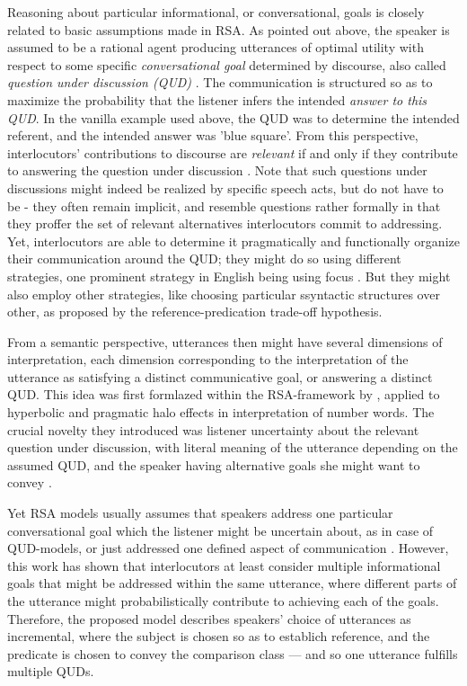 Reasoning about particular informational, or conversational, goals is closely related to basic assumptions made in RSA.
As pointed out above, the speaker is assumed to be a rational agent producing utterances of optimal utility with respect to some specific \emph{conversational goal} determined by discourse, also called \emph{question under discussion (QUD)}  \parencite{lassiter2017adjectival, roberts2012information}. The communication is structured so as to maximize the probability that the listener infers the intended \emph{answer to this QUD}. In the vanilla example used above, the QUD was to determine the intended referent, and the intended answer was 'blue square'. From this perspective, interlocutors' contributions to discourse are \emph{relevant} if and only if they contribute to answering the question under discussion \parencite{roberts2012information}. Note that such questions under discussions might indeed be realized by specific speech acts, but do not have to be - they often remain implicit, and resemble questions rather formally in that they proffer the set of relevant alternatives interlocutors commit to addressing. Yet, interlocutors are able to determine it pragmatically and functionally organize their communication around the QUD; they might do so using different strategies, one prominent strategy in English being using focus \parencite{roberts2012information}. But they might also employ other strategies, like choosing particular ssyntactic structures over other, as proposed by the reference-predication trade-off hypothesis.  

From a semantic perspective, utterances then might have several dimensions of interpretation, each dimension corresponding to the interpretation of the utterance as satisfying a distinct communicative goal, or answering a distinct QUD. This idea was first formlazed within the RSA-framework by \textcite{kao2014nonliteral}, applied to hyperbolic and pragmatic halo effects in interpretation of number words. The crucial novelty they introduced was listener uncertainty about the relevant question under discussion, with literal meaning of the utterance depending on the assumed QUD, and the speaker having alternative goals she might want to convey \parencite{kao2014nonliteral}. 

Yet RSA models usually assumes that speakers address one particular conversational goal which the listener might be uncertain about, as in case of QUD-models, or just addressed one defined aspect of communication \parencite[see][for an excellent overview]{problang}. However, this work has shown that interlocutors at least consider multiple informational goals that might be addressed within the same utterance, where different parts of the utterance might probabilistically contribute to achieving each of the goals. Therefore, the proposed model describes speakers' choice of utterances as incremental, where the subject is chosen so as to establich reference, and the predicate is chosen to convey the comparison class --- and so one utterance fulfills multiple QUDs. 
